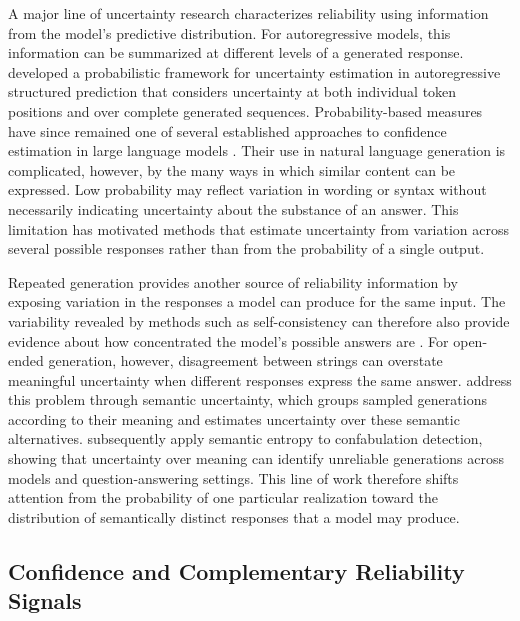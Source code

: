 \documentclass{article}
\begin{document}
A major line of uncertainty research characterizes reliability using information from the model's predictive distribution. For autoregressive models, this information can be summarized at different levels of a generated response. \citet{malinin2021uncertainty} developed a probabilistic framework for uncertainty estimation in autoregressive structured prediction that considers uncertainty at both individual token positions and over complete generated sequences. Probability-based measures have since remained one of several established approaches to confidence estimation in large language models \citep{geng2024survey}. Their use in natural language generation is complicated, however, by the many ways in which similar content can be expressed. Low probability may reflect variation in wording or syntax without necessarily indicating uncertainty about the substance of an answer. This limitation has motivated methods that estimate uncertainty from variation across several possible responses rather than from the probability of a single output.

Repeated generation provides another source of reliability information by exposing variation in the responses a model can produce for the same input. The variability revealed by methods such as self-consistency can therefore also provide evidence about how concentrated the model's possible answers are \citep{wang2023selfconsistency}. For open-ended generation, however, disagreement between strings can overstate meaningful uncertainty when different responses express the same answer. \citet{kuhn2023semantic} address this problem through semantic uncertainty, which groups sampled generations according to their meaning and estimates uncertainty over these semantic alternatives. \citet{farquhar2024semantic} subsequently apply semantic entropy to confabulation detection, showing that uncertainty over meaning can identify unreliable generations across models and question-answering settings. This line of work therefore shifts attention from the probability of one particular realization toward the distribution of semantically distinct responses that a model may produce.

\subsection{Confidence and Complementary Reliability Signals}
\end{document}
